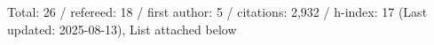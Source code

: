 Total: 26 / refereed: 18 / first author: 5 / citations: 2,932 / h-index: 17 (Last updated: 2025-08-13), List attached below